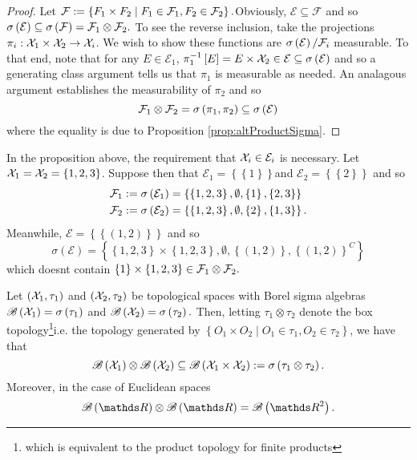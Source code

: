 \begin{proof}
Let $\mathcal{F}:=\left\{ F_{1}\times F_{2}\mid F_{1}\in\mathcal{F}_{1},F_{2}\in\mathcal{F}_{2}\right\} .$Obviously,
$\mathcal{E}\subseteq\mathcal{F}$ and so $\sigma\left(\mathcal{E}\right)\subseteq\sigma\left(\mathcal{F}\right)=\mathcal{F}_{1}\otimes\mathcal{F}_{2}.$
To see the reverse inclusion, take the projections $\pi_{i}:\mathcal{X}_{1}\times\mathcal{X}_{2}\to\mathcal{X}_{i}$.
We wish to show these functions are $\sigma\left(\mathcal{E}\right)/\mathcal{F}_{i}$
measurable. To that end, note that for any $E\in\mathcal{E}_{1}$,
$\pi_{1}^{-1}\left[E\right]=E\times\mathcal{X}_{2}\in\mathcal{E}\subseteq\sigma\left(\mathcal{E}\right)$
and so a generating class argument tells us that $\pi_{1}$ is measurable
as needed. An analagous argument establishes the measurability of
$\pi_{2}$ and so 
\[
\mathcal{F}_{1}\otimes\mathcal{F}_{2}=\sigma\left(\pi_{1},\pi_{2}\right)\subseteq\sigma\left(\mathcal{E}\right)
\]
where the equality is due to Proposition \ref{prop:altProductSigma}.
\end{proof}
\begin{example}
\label{exa:XinEnecessaryForProductGeneration}In the proposition above,
the requirement that $\mathcal{X}_{i}\in\mathcal{E}_{i}$ is necessary. Let
$\mathcal{X}_{1}=\mathcal{X}_{2}=\left\{ 1,2,3\right\} $. Suppose then that $\mathcal{E}_{1}=\left\{ \left\{ 1\right\} \right\} $and
$\mathcal{E}_{2}=\left\{ \left\{ 2\right\} \right\} $ and so
\begin{align*}
\mathcal{F}_{1} & :=\sigma\left(\mathcal{E}_{1}\right)=\left\{ \left\{ 1,2,3\right\} ,\emptyset,\left\{ 1\right\} ,\left\{ 2,3\right\} \right\} \\
\mathcal{F}_{2} & :=\sigma\left(\mathcal{E}_{2}\right)=\left\{ \left\{ 1,2,3\right\} ,\emptyset,\left\{ 2\right\} ,\left\{ 1,3\right\} \right\} .
\end{align*}
Meanwhile, $\mathcal{E}=\left\{ \left\{ \left(1,2\right)\right\} \right\} $
and so
\[
\sigma\left(\mathcal{E}\right)=\left\{ \left\{ 1,2,3\right\} \times\left\{ 1,2,3\right\} ,\emptyset,\left\{ \left(1,2\right)\right\} ,\left\{ \left(1,2\right)\right\} ^{C}\right\} 
\]
which doesnt contain $\left\{ 1\right\} \times\left\{ 1,2,3\right\} \in\mathcal{F}_{1}\otimes\mathcal{F}_{2}.$
\end{example}

\begin{prop}
\label{prop:borelProductInclusion}Let $\left(\mathcal{X}_{1},\tau_{1}\right)$
and $\left(\mathcal{X}_{2},\tau_{2}\right)$ be topological spaces with Borel
sigma algebras $\mathscr{B}\left(\mathcal{X}_{1}\right)=\sigma\left(\tau_{1}\right)$
and $\mathscr{B}\left(\mathcal{X}_{2}\right)=\sigma\left(\tau_{2}\right).$ Then,
letting $\tau_{1}\otimes\tau_{2}$ denote the box topology\footnote{which is equivalent to the product topology for finite products}i.e.
the topology generated by $\left\{ O_{1}\times O_{2}\mid O_{1}\in\tau_{1},O_{2}\in\tau_{2}\right\} $,
we have that 
\[
\mathscr{B}\left(\mathcal{X}_{1}\right)\otimes\mathscr{B}\left(\mathcal{X}_{2}\right)\subseteq\mathscr{B}\left(\mathcal{X}_{1}\times\mathcal{X}_{2}\right):=\sigma\left(\tau_{1}\otimes\tau_{2}\right).
\]
Moreover, in the case of Euclidean spaces
\[
\borel\left(\R\right)\otimes\borel\left(\R\right)=\borel\left(\R^{2}\right).
\]
\end{prop}

